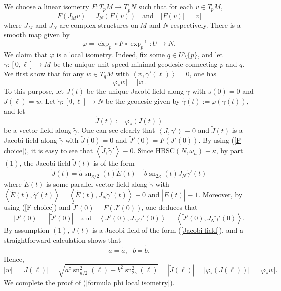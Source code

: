 \documentclass[12pt]{amsart}
\theoremstyle{plain}
\theoremstyle{definition}
\renewcommand{\phi}{\varphi}
\newcommand{\beq}{\begin{equation}}
\newcommand{\eeq}{\end{equation}}
\renewcommand{\tilde}{\widetilde}
\newcommand{\qtq}[1]{\quad\mbox{#1}\quad}
\renewcommand{\>}{\rightarrow}
\newcommand{\LL}{\left\langle}
\newcommand{\RL}{\right\rangle}
\newcommand{\om}{\omega}
\numberwithin{equation}{section} %
\begin{document}
	
	We choose a linear isometry $F:T_pM\to T_{\tilde p}N$ such that for each $v\in T_pM$,
	\beq F\left(J_Mv\right) =J_N\left(F(v)\right)\qtq{and} |F(v)|=|v|\label{F choice}\eeq
	where $J_M$ and $J_N$ are complex structures on $M$ and $N$ respectively.
	There is a smooth map given by
\beq 
		\phi= \tilde{\exp}_{\tilde p}\circ F\circ {\exp}_p^{-1}: U\to N.
\eeq 
	We claim that $\phi$ is a local isometry.
	Indeed, fix some $q\in U\setminus\{p\}$, and let $\gamma:[0,\ell]\to M$ be the unique unit-speed minimal geodesic connecting $p$ and $q$.
	We first show that for any $w\in T_qM$ with $\LL w,\gamma'(\ell)\RL=0$, one has 
	\beq |\phi_*w|=|w| . \label{formula phi local isometry}\eeq
  To this purpose,	let $J(t)$ be the unique Jacobi field along $\gamma$ with $J(0)=0$ and $J(\ell)=w$.
	Let $\tilde\gamma:[0,\ell]\to N$ be the geodesic given by $\tilde\gamma(t):=\phi(\gamma(t))$,
	and let $$ \tilde J(t):=\phi_*(J(t))$$ be a vector field along $\tilde{\gamma}$.
	One can see clearly that $\LL J,\gamma'\RL\equiv 0$ and $\tilde J(t)$ is a Jacobi field along $\tilde\gamma$ with $\tilde J(0)=0$ and $\tilde J'(0)=F(J'(0))$. 
	By using (\ref{F choice}), it is easy to see that $\LL\tilde J,\tilde\gamma'\RL\equiv 0$.
	Since $\mathrm{HBSC}(N,\om_h)\equiv \kappa$, by part $(1)$, the Jacobi field $\tilde J(t)$ is of the form
	\beq
	\tilde J(t)=\tilde a \operatorname{sn}_{\kappa/2}(t)\tilde E(t)+ \tilde b\operatorname{sn}_{2\kappa}(t)J_N\tilde \gamma'(t)\label{tilde J form}
	\eeq
	where $\tilde E(t)$ is some parallel vector field along $\tilde \gamma$ with $\LL \tilde E(t),\tilde \gamma'(t)\RL=\LL \tilde E(t),J_N\tilde \gamma'(t)\RL\equiv 0$ and $|\tilde E(t)|\equiv 1$.
	Moreover, by using (\ref{F choice}) and $\tilde J'(0)=F(J'(0))$, one deduces that
	\beq |J'(0)|=|\tilde J'(0)|\qtq{and}\LL J'(0),J_M\gamma'(0)\RL=\LL \tilde J'(0),J_N\tilde \gamma'(0)\RL.\label{Jacobi relation}\eeq
By assumption $(1)$,  $J(t)$ is a Jacobi field of the form (\ref{Jacobi field}), and a straightforward calculation shows that  $$a=\tilde a, \ \ \ b=\tilde b.$$ Hence,   $$|w|=|J(\ell)|=\sqrt{a^2 \operatorname{sn}_{\kappa/2}^2(\ell)+b^2\operatorname{sn}^2_{2\kappa}(\ell)}=|\tilde J(\ell)|=|\phi_*(J(\ell))|=|\phi_*w|.$$ 
	We complete the proof of (\ref{formula phi local isometry}). \\
	
\end{document}
